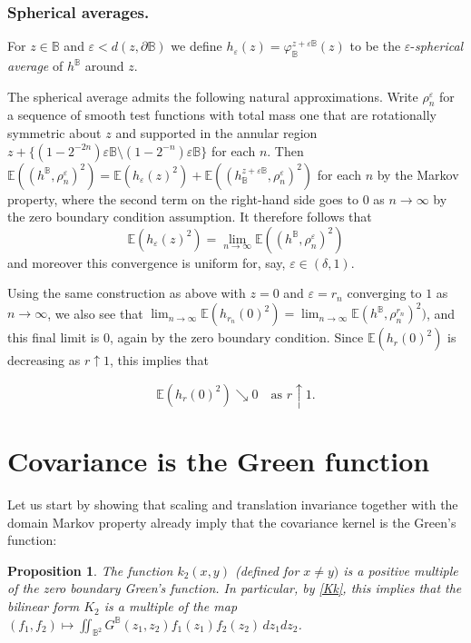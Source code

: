\documentclass[JEP,XML,SOM,Unicode,published]{cedram}
\newtheorem{prop}[theorem]{Proposition}
\theoremstyle{definition}
\newcommand{\E}{\mathbb{E}}
\newcommand{\B}{\mathbb{B}}\let\D\B\let\Ub\B
\let\eps\varepsilon
\begin{document}
\subsubsection*{Spherical averages.}
For $z\in \B$ and $\eps<d(z,\partial \B)$ we define $h_\eps(z)=\varphi_\B^{z+\eps\B}(z)$ to be the $\eps$-\emph{spherical average} of $h^\B$ around $z$.
{
The spherical average admits the following natural approximations. Write $\rho_n^{\eps}$ for a sequence of smooth test functions with total mass one that are rotationally symmetric about $z$ and supported in the annular region $z+\{(1-2^{-2n})\eps\B\setminus (1-2^{-n})\eps\B\}$ for each $n$. Then $\E((h^\B,\rho_n^{\eps})^2)=\E(h_\eps(z)^2)+\E((h_\B^{z+\eps\B},\rho_n^{\eps})^2)$ for each $n$ by the Markov property, where the second term on the right-hand side goes to $0$ as $n\to \infty$ by the zero boundary condition assumption. It therefore follows that
\[
\E(h_\eps(z)^2)=\lim_{n\to \infty} \E((h^\B,\rho_n^{\eps})^2)
\]
and moreover this convergence is uniform for, say, $\eps \in (\delta,1)$.

Using the same construction as above with $z=0$ and $\eps=r_n$ converging to $1$ as $n\to\infty$, we also see that $\lim_{n\to \infty} \E(h_{r_n}(0)^2)=\lim_{n\to \infty} \E(h^\B,\rho_n^{r_n})^2)$, and this final limit is $0$, again by the zero boundary condition. Since $\E(h_r(0)^2)$ is decreasing as $r\uparrow 1$, this implies that}\vspace*{-3pt}\enlargethispage{\baselineskip}%
\begin{equation}\label{eq:circav0bc}
\E(h_r(0)^2)\searrow 0 \quad\text{as } r\uparrow 1.
\end{equation}

\section{Covariance is the Green function}\label{sec:cov}
Let us start by showing that scaling and translation invariance together with the domain Markov property already imply that the covariance kernel is the Green's function:

\begin{prop}\label{lem:cov}
The function $k_2(x,y)$ (defined for $x\ne y)$ is a positive multiple of the zero boundary Green's function. In particular, by \eqref{Kk}, this implies that the bilinear form $K_2$ is a multiple of the map $(f_1,f_2)\mapsto \iint_{\B^2} G^\B(z_1,z_2)f_1(z_1)f_2(z_2) \, dz_1 dz_2$.
\end{prop}
\end{document}
